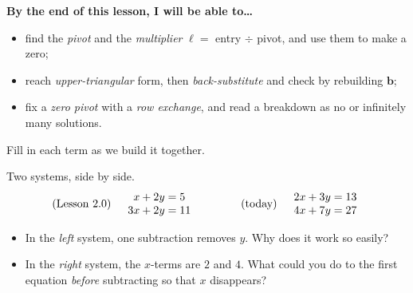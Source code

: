 \documentclass[10pt]{article}
\newcommand{\bb}{\mathbf{b}}
\begin{document}

\vspace{0.12in}

\begin{objectivebox}
\textbf{By the end of this lesson, I will be able to\dots}
\begin{itemize}\setlength{\itemsep}{2pt}
  \item find the \emph{pivot} and the \emph{multiplier} $\ell=$ entry $\div$ pivot, and use them to make a zero;
  \item reach \emph{upper-triangular} form, then \emph{back-substitute} and check by rebuilding $\bb$;
  \item fix a \emph{zero pivot} with a \emph{row exchange}, and read a breakdown as no or infinitely many solutions.
\end{itemize}
\end{objectivebox}

\vspace{0.10in}

\begin{vocabbox}
\small
Fill in each term as we build it together.
\par\vspace{2pt}
\end{vocabbox}

\begin{hookbox}
Two systems, side by side.
\[
  \text{(Lesson 2.0)}\quad
  \begin{array}{r@{}c@{}l} x &{}+ 2y ={}& 5 \\ 3x &{}+ 2y ={}& 11 \end{array}
  \qquad\qquad
  \text{(today)}\quad
  \begin{array}{r@{}c@{}l} 2x &{}+ 3y ={}& 13 \\ 4x &{}+ 7y ={}& 27 \end{array}
\]
\begin{itemize}\setlength{\itemsep}{1pt}
  \item In the \emph{left} system, one subtraction removes $y$. Why does it work so easily? \writeline
  \item In the \emph{right} system, the $x$-terms are $2$ and $4$. What could you do to the first
        equation \emph{before} subtracting so that $x$ disappears? \writeline
\end{itemize}
\end{hookbox}
\end{document}

